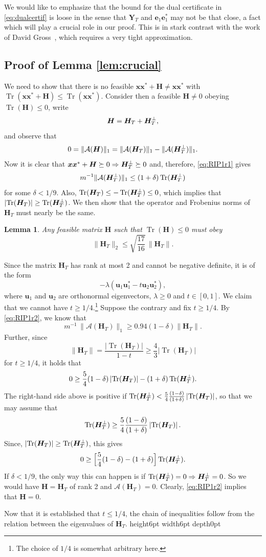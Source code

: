 \documentclass[11pt]{article}
\newtheorem{lemma}[theorem]{Lemma}
\newcommand{\<}{\langle}
\renewcommand{\>}{\rangle}
\newcommand{\bx}{\bm{x}}
\newcommand{\bH}{\bm{H}}
\newcommand{\bY}{\bm{Y}}
\newcommand{\bu}{\bm{u}}
\newcommand{\be}{\bm{e}}
\newcommand{\tr}{\operatorname{Tr}}
\numberwithin{equation}{section}
\def \endprf{\hfill {\vrule height6pt width6pt depth0pt}\medskip}
\newenvironment{proof}{\noindent {\bf Proof} }{\endprf\par}
\newcommand{\cA}{\mathcal{A}}
\begin{document}
We would like to emphasize that the bound for the dual certificate in
\eqref{eq:dualcertif} is loose in the sense that $\bY_T$ and $\be_1 \be_1^*$
may not be that close, a fact which will play a crucial role in our
proof.  This is in stark contrast with the work of David
Gross~\cite{Gross09}, which requires a very tight approximation.

\subsection{Proof of Lemma \ref{lem:crucial}}

We need to show that there is no feasible $\bx\bx^* + \bH \neq \bx\bx^*$ with
$\tr(\bx\bx^* + \bH) \leq \tr(\bx\bx^*)$.  Consider then a feasible $\bH \neq 0$
obeying $\tr(\bH) \le 0$, write
\[
\bH = \bH_T + \bH_\Tp,
\]
and observe that 
\begin{equation}
\label{eq:AH}
0 = \|\cA(\bH)\|_1 = \|\cA(\bH_T)\|_1 - \|\cA(\bH_\Tp)\|_1.  
\end{equation}
Now it is clear that $\bx\bx^* + \bH \succeq 0 \Rightarrow \bH_\Tp \succeq 0$
and, therefore, \eqref{eq:RIP1r1} gives
\[
m^{-1} \|\cA(\bH_\Tp)\|_1 \le (1+\delta) \tr(\bH_\Tp)
\]
for some $\delta < 1/9$.  Also, $\tr(\bH_T) \le -\tr(\bH_\Tp) \le 0$, which
implies that $\left|\tr(\bH_T)\right| \geq \tr(\bH_\Tp)$.  We then show
that the operator and Frobenius norms of $\bH_T$ must nearly be the
same.
\begin{lemma}
  \label{lem:RIP}
  Any feasible matrix $\bH$ such that $\tr(\bH) \le 0$ must obey
\[
\|\bH_T\|_2 \le \sqrt{\frac{17}{16}} \, \|\bH_T\|.
\]
\end{lemma}
\begin{proof}
  Since the matrix $\bH_T$ has rank at most 2 and cannot be negative
  definite, it is of the form
\[
-\lambda (\bu_1 \bu_1^* - t \bu_2 \bu_2^*),  
\]
where $\bu_1$ and $\bu_2$ are orthonormal eigenvectors, $\lambda \ge 0$
and $t \in [0,1]$. We claim that we cannot have $t \ge
1/4$.\footnote{The choice of $1/4$ is somewhat arbitrary here.}
Suppose the contrary and fix $t \ge 1/4$. By \eqref{eq:RIP1r2}, we
know that
\[
m^{-1} \, \|\cA(\bH_T)\|_1 \ge 0.94 (1-\delta) \|\bH_T\|.
\]
Further, since
\[
\|\bH_T\| = \frac{|\tr(\bH_T)|}{1-t} \ge \frac{4}{3} |\tr(\bH_T)|
\]
for $t \ge 1/4$, it holds that 
\[
0 \geq \frac{5}{4}(1-\delta)\left|\tr(\bH_T) \right| -
(1+\delta)\tr(\bH_\Tp). 
\]
The right-hand side above is positive if $\tr(\bH_\Tp) <
\frac{5}{4}\frac{(1-\delta)}{(1+\delta)}\left|\tr(\bH_T)\right|$, so
that we may assume that
\[
\tr(\bH_\Tp) \geq \frac{5}{4}\frac{(1-\delta)}{(1+\delta)}\left|\tr(\bH_T)\right|. 
\]
Since, $\left|\tr(\bH_T)\right| \geq \tr(\bH_\Tp)$, this gives
\[
0 \ge \Bigl[\frac{5}{4}(1-\delta) - (1+\delta)\Bigr] \tr(\bH_\Tp).
\]
If $\delta < 1/9$, the only way this can happen is if $\tr(\bH_\Tp) = 0
\Rightarrow \bH_\Tp = 0$. So we would have $\bH = \bH_T$ of rank 2 and
$\cA(\bH_T) = 0$. Clearly, \eqref{eq:RIP1r2} implies that $\bH = 0$.

Now that it is established that $t \le 1/4$, the chain of inequalities
follow from the relation between the eigenvalues of $\bH_T$. 
\end{proof}
\end{document}
